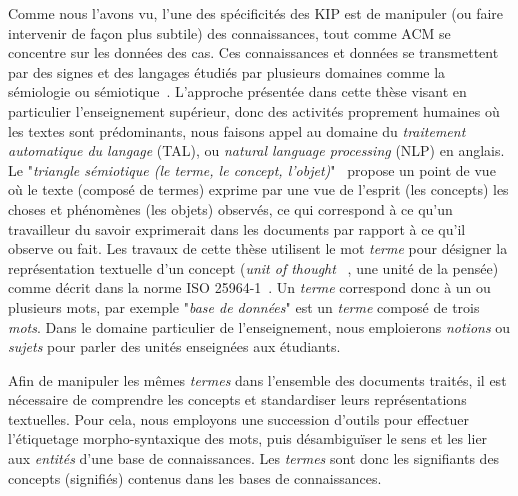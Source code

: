 Comme nous l'avons vu, l'une des spécificités des KIP est de manipuler (ou faire intervenir de façon plus subtile) des connaissances, tout comme ACM se concentre sur les données des cas.
Ces connaissances et données se transmettent par des signes et des langages étudiés par plusieurs domaines comme la sémiologie ou sémiotique~\cite{goosse2016bon}.
L'approche présentée dans cette thèse visant en particulier l'enseignement supérieur, donc des activités proprement humaines où les textes sont prédominants, nous faisons appel au domaine du \textit{traitement automatique du langage} (TAL), ou \textit{natural language processing} (NLP) en anglais.
Le "\textit{triangle sémiotique (le terme, le concept, l'objet)}"~\cite{zargayouna2015recherche} propose un point de vue où le texte (composé de termes) exprime par une vue de l'esprit (les concepts) les choses et phénomènes (les objets) observés, ce qui correspond à ce qu'un travailleur du savoir exprimerait dans les documents par rapport à ce qu'il observe ou fait.
Les travaux de cette thèse utilisent le mot \textit{terme} pour désigner la représentation textuelle d'un concept (\og \textit{unit of thought} \fg~\cite{ISO-25964-1}, une unité de la pensée) comme décrit dans la norme ISO 25964-1~\cite{ISO-25964-1}\cite{LivreBlancISO25964-1}.
Un \textit{terme} correspond donc à un ou plusieurs mots, par exemple "\textit{base de données}" est un \textit{terme} composé de trois \textit{mots}.
Dans le domaine particulier de l'enseignement, nous emploierons \textit{notions} ou \textit{sujets} pour parler des unités enseignées aux étudiants.

\bigskip

Afin de manipuler les mêmes \textit{termes} dans l'ensemble des documents traités, il est nécessaire de comprendre les concepts et standardiser leurs représentations textuelles.
Pour cela, nous employons une succession d'outils pour effectuer l'étiquetage morpho-syntaxique des mots, puis désambiguïser le sens et les lier aux \textit{entités} d'une base de connaissances.
Les \textit{termes} sont donc les signifiants des concepts (signifiés) contenus dans les bases de connaissances.

\bigskip


